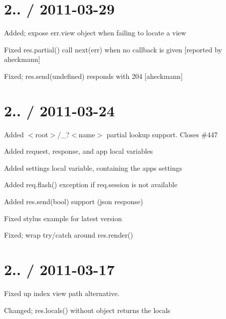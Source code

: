 \section*{2.. / 2011-\/03-\/29 }


\begin{DoxyItemize}
\item Added; expose {\ttfamily err.\+view} object when failing to locate a view
\item Fixed {\ttfamily res.\+partial()} call {\ttfamily next(err)} when no callback is given \mbox{[}reported by aheckmann\mbox{]}
\item Fixed; {\ttfamily res.\+send(undefined)} responds with 204 \mbox{[}aheckmann\mbox{]}
\end{DoxyItemize}

\section*{2.. / 2011-\/03-\/24 }


\begin{DoxyItemize}
\item Added {\ttfamily $<$root$>$/\+\_\+?$<$name$>$} partial lookup support. Closes \#447
\item Added {\ttfamily request}, {\ttfamily response}, and {\ttfamily app} local variables
\item Added {\ttfamily settings} local variable, containing the app\textquotesingle{}s settings
\item Added {\ttfamily req.\+flash()} exception if {\ttfamily req.\+session} is not available
\item Added {\ttfamily res.\+send(bool)} support (json response)
\item Fixed stylus example for latest version
\item Fixed; wrap try/catch around {\ttfamily res.\+render()}
\end{DoxyItemize}

\section*{2.. / 2011-\/03-\/17 }


\begin{DoxyItemize}
\item Fixed up index view path alternative.
\item Changed; {\ttfamily res.\+locals()} without object returns the locals
\end{DoxyItemize}


